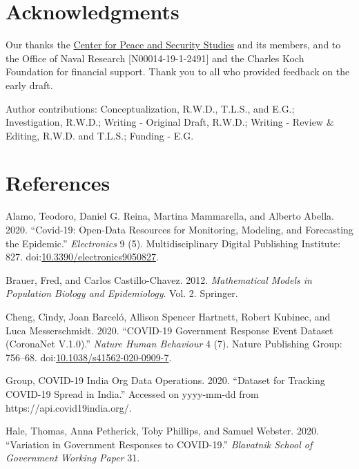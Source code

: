 \documentclass[10pt,letterpaper]{article}
\begin{document}
\section{Acknowledgments}\label{acknowledgments}

Our thanks the \href{www.ucsd.cpass.edu}{Center for Peace and Security
Studies} and its members, and to the Office of Naval Research
{[}N00014-19-1-2491{]} and the Charles Koch Foundation for financial
support. Thank you to all who provided feedback on the early draft.

Author contributions: Conceptualization, R.W.D., T.L.S., and E.G.;
Investigation, R.W.D.; Writing - Original Draft, R.W.D.; Writing -
Review \& Editing, R.W.D. and T.L.S.; Funding - E.G.

\section*{References}\label{references}

\hypertarget{refs}{}
\hypertarget{ref-alamoCovid19OpenDataResources2020}{}
Alamo, Teodoro, Daniel G. Reina, Martina Mammarella, and Alberto Abella.
2020. ``Covid-19: Open-Data Resources for Monitoring, Modeling, and
Forecasting the Epidemic.'' \emph{Electronics} 9 (5). Multidisciplinary
Digital Publishing Institute: 827.
doi:\href{https://doi.org/10.3390/electronics9050827}{10.3390/electronics9050827}.

\hypertarget{ref-brauerMathematicalModelsPopulation2012}{}
Brauer, Fred, and Carlos Castillo-Chavez. 2012. \emph{Mathematical
Models in Population Biology and Epidemiology}. Vol. 2. Springer.

\hypertarget{ref-chengCOVID19GovernmentResponse2020a}{}
Cheng, Cindy, Joan Barceló, Allison Spencer Hartnett, Robert Kubinec,
and Luca Messerschmidt. 2020. ``COVID-19 Government Response Event
Dataset (CoronaNet V.1.0).'' \emph{Nature Human Behaviour} 4 (7). Nature
Publishing Group: 756--68.
doi:\href{https://doi.org/10.1038/s41562-020-0909-7}{10.1038/s41562-020-0909-7}.

\hypertarget{ref-covid19indiaorg2020tracker}{}
Group, COVID-19 India Org Data Operations. 2020. ``Dataset for Tracking
COVID-19 Spread in India.'' Accessed on yyyy-mm-dd from
https://api.covid19india.org/.

\hypertarget{ref-haleVariationGovernmentResponses2020}{}
Hale, Thomas, Anna Petherick, Toby Phillips, and Samuel Webster. 2020.
``Variation in Government Responses to COVID-19.'' \emph{Blavatnik
School of Government Working Paper} 31.
\end{document}
